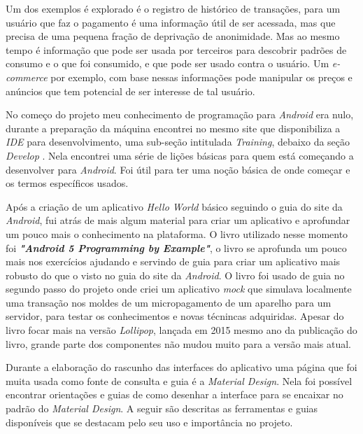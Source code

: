 \documentclass[hidelinks,12pt]{article}
\begin{document}
Um dos exemplos \'e explorado \'e o registro de hist\'orico de transa\c{c}\~oes, para um usu\'ario que faz o pagamento \'e uma informa\c{c}\~ao útil de ser acessada, mas que precisa de uma pequena fra\c{c}\~ao de depriva\c{c}\~ao de anonimidade. Mas ao mesmo tempo \'e informa\c{c}\~ao que pode ser usada por terceiros para descobrir padr\~oes de consumo e o que foi consumido, e que pode ser usado contra o usu\'ario. Um \textit{e-commerce} por exemplo, com base nessas informa\c{c}\~oes pode manipular os pre\c{c}os e anúncios que tem potencial de ser interesse de tal usu\'ario.

No come\c{c}o do projeto meu conhecimento de programa\c{c}\~ao para \textit{Android} era nulo, durante a prepara\c{c}\~ao da m\'aquina encontrei no mesmo site que disponibiliza a \textit{IDE} para desenvolvimento, uma sub-se\c{c}\~ao intitulada \textit{Training}, debaixo da se\c{c}\~ao \textit{Develop} \cite{anddev}. Nela encontrei uma s\'erie de li\c{c}\~oes b\'asicas para quem est\'a come\c{c}ando a desenvolver para \textit{Android}. Foi \'util para ter uma no\c{c}\~ao b\'asica de onde come\c{c}ar e os termos espec\'ificos usados.

Ap\'os a cria\c{c}\~ao de um aplicativo \textit{Hello World} b\'asico seguindo o guia \cite{androidhw} do site da \textit{Android}, fui atr\'as de mais algum material para criar um aplicativo e aprofundar um pouco mais o conhecimento na plataforma. O livro \cite{andppe} utilizado nesse momento foi \textbf{\textit{"Android 5 Programming by Example"}}, o livro \cite{andppe} se aprofunda um pouco mais nos exerc\'icios ajudando e servindo de guia para criar um aplicativo mais robusto do que o visto no guia do site da \textit{Android}. O livro \cite{andppe} foi usado de guia no segundo passo do projeto onde criei um aplicativo \textit{mock} que simulava localmente uma transa\c{c}\~ao nos moldes de um micropagamento de um aparelho para um servidor, para testar os conhecimentos e novas t\'ecnincas adquiridas. Apesar do livro \cite{andppe} focar mais na vers\~ao \textit{Lollipop}, lan\c{c}ada em 2015 mesmo ano da publica\c{c}\~ao do livro, grande parte dos componentes n\~ao mudou muito para a vers\~ao mais atual.


Durante a elabora\c{c}\~ao do rascunho das interfaces do aplicativo uma p\'agina \cite{material} que foi muita usada como fonte de consulta e guia \'e a \textit{Material Design}. Nela foi poss\'ivel encontrar orienta\c{c}\~oes e guias de como desenhar a interface para se encaixar no padr\~ao do \textit{Material Design}. A seguir s\~ao descritas as ferramentas e guias dispon\'iveis que se destacam pelo seu uso e importância no projeto.
\end{document}
